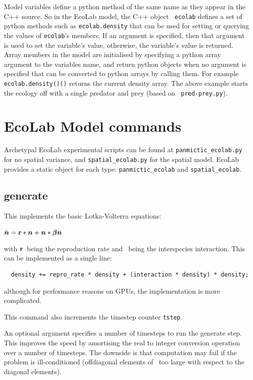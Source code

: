 \documentclass{article}
\newcommand{\br}{\mbox{${\bf r}$}} %
\newcommand{\bbeta}{\mbox{\boldmath{$\beta$}}}   %
\newcommand{\bn}{\mbox{\boldmath{$n$}}}          %
\begin{document}
Model variables define a python method of the same name as they appear
in the C++ source. So in the EcoLab model, the C++ object {\tt
  ecolab} defines a set of python methods such as {\tt ecolab.density}
that can be used for setting or querying the values of {\tt ecolab}'s
members.  If an argument is specified, then that argument is used to
set the variable's value, otherwise, the variable's value is returned.
Array members in the model are initialised by specifying a python
array argument to the variables name, and return python objects when
no argument is specified that can be converted to python arrays by
calling them. For example \verb+ecolab.density()()+ returns the
current density array. The above example starts the ecology off with a
single predator and prey (based on {\tt
  pred-prey.py}).

\section{EcoLab Model commands}

Archetypal EcoLab experimental scripts can be found at
\verb+panmictic_ecolab.py+ for no spatial variance, and
\verb+spatial_ecolab.py+ for the spatial model. EcoLab provides a
static object for each type: \verb+panmictic_ecolab+ and \verb+spatial_ecolab+.

\subsection{generate}

This implements the basic Lotka-Volterra equations:

\begin{math}
\dot{\bn} = \br*\bn + \bn*\bbeta\bn
\end{math}

with \br\ being the reproduction rate and \bbeta\ being the
interspecies interaction. This can be implemented as a single line:
\begin{verbatim}
  density += repro_rate * density + (interaction * density) * density;
\end{verbatim}
although for performance reasons on GPUs, the implementation is more
complicated.

This command also increments the timestep counter {\tt tstep}.

An optional argument specifies a number of timesteps to run the
generate step. This improves the speed by amortising the real to
integer conversion operation over a number of timesteps. The downside
is that computation may fail if the problem is ill-conditioned
(offdiagonal elements of \bbeta\ too large with respect to the
diagonal elements).
\end{document}
